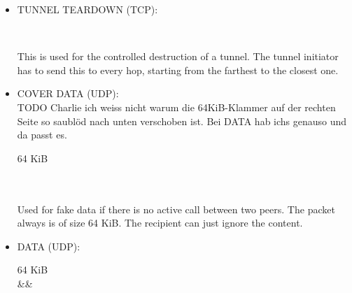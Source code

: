 \documentclass{article}
\begin{document}
\begin{itemize}
\begin{bytefield}[bitwidth=2.2em]{16}
	 \\
\end{bytefield}

This is sent at regular intervals from the tunnel initiator to the node at the end of the tunnel and vice-versa. If one of the two nodes does not receive a heartbeat in a certain time interval, it needs to assume that the tunnel is down and establish or wait for a new one. 
	
\item TUNNEL TEARDOWN (TCP): \\

\begin{bytefield}[bitwidth=2.2em]{16}
	 \\
\end{bytefield}

This is used for the controlled destruction of a tunnel. The tunnel initiator has to send this to every hop, starting from the farthest to the closest one.

\item COVER DATA (UDP): \\

TODO Charlie ich weiss nicht warum die 64KiB-Klammer auf der rechten Seite so saublöd nach unten verschoben ist. Bei DATA hab ichs genauso und da passt es.


\begin{bytefield}[bitwidth=2.2em]{16}
	\begin{rightwordgroup}{64 KiB}
		 \\
		 \\
		 \\
	\end{rightwordgroup}
\end{bytefield}

Used for fake data if there is no active call between two peers. The packet always is of size 64 KiB. The recipient can just ignore the content.


\item DATA (UDP): \\

\begin{bytefield}[bitwidth=2.2em]{16}
	\begin{rightwordgroup}{64 KiB}
	 \\
	 &&  \\
	 \\
	 \\
	\end{rightwordgroup}
\end{bytefield}


\end{itemize}
\end{document}
